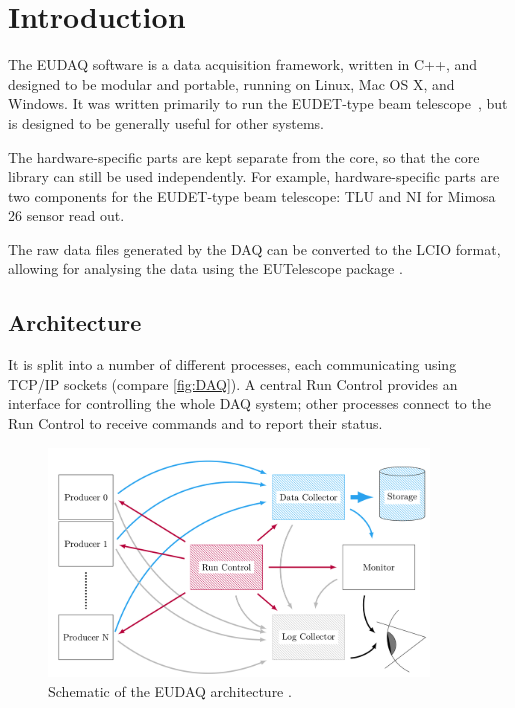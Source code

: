 \section{Introduction}
The EUDAQ software is a data acquisition framework, written in C++,
and designed to be modular and portable, running on Linux, Mac OS X, and Windows.
It was written primarily to run the EUDET-type beam telescope~\cite{Roloff:2009zza,Jansen:2016},
but is designed to be generally useful for other systems.

The hardware-specific parts are kept separate from the core,
so that the core library can still be used independently.
For example, hardware-specific parts are two components for the EUDET-type beam telescope: \gls{TLU} and \gls{NI} for Mimosa 26 sensor read out.

The raw data files generated by the DAQ can be converted to the \gls{LCIO} format,
allowing for analysing the data using the EUTelescope package \cite{eutel2008}.

\subsection{Architecture}
It is split into a number of different processes,
each communicating using TCP/IP sockets (compare \autoref{fig:DAQ}).
A central Run Control provides an interface for controlling the whole DAQ system;
other processes connect to the Run Control to receive commands and to report their status.

\begin{figure}[htb]
  \begin{center}
    \includegraphics[width=0.9\textwidth]{src/images/eudaq_working_principle}
    \caption{Schematic of the EUDAQ architecture \cite{Spannagel:2016}.}
    \label{fig:DAQ}
  \end{center}
\end{figure}

